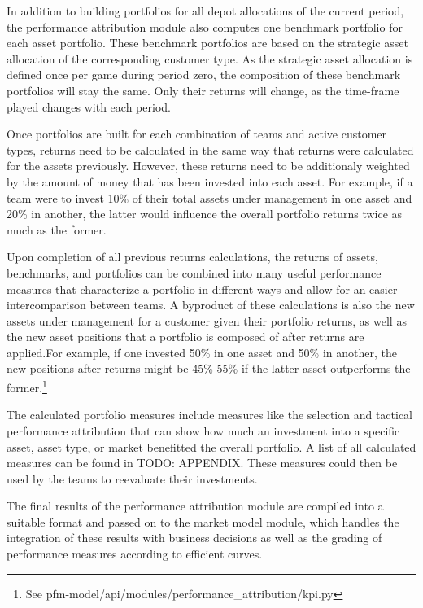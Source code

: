 In addition to building portfolios for all depot allocations of the current period, the performance attribution module also computes one benchmark portfolio for each asset portfolio. These benchmark portfolios are based on the strategic asset allocation of the corresponding customer type. As the strategic asset allocation is defined once per game during period zero, the composition of these benchmark portfolios will stay the same. Only their returns will change, as the time-frame played changes with each period.

Once portfolios are built for each combination of teams and active customer types, returns need to be calculated in the same way that returns were calculated for the assets previously. However, these returns need to be additionaly weighted by the amount of money that has been invested into each asset. For example, if a team were to invest 10\% of their total assets under management in one asset and 20\% in another, the latter would influence the overall portfolio returns twice as much as the former.

Upon completion of all previous returns calculations, the returns of assets, benchmarks, and portfolios can be combined into many useful performance measures that characterize a portfolio in different ways and allow for an easier intercomparison between teams. A byproduct of these calculations is also the new assets under management for a customer given their portfolio returns, as well as the new asset positions that a portfolio is composed of after returns are applied.For example, if one invested 50\% in one asset and 50\% in another, the new positions after returns might be 45\%-55\% if the latter asset outperforms the former.\footnote{See pfm-model/api/modules/performance\_attribution/kpi.py}

The calculated portfolio measures include measures like the selection and tactical performance attribution that can show how much an investment into a specific asset, asset type, or market benefitted the overall portfolio. A list of all calculated measures can be found in TODO: APPENDIX. These measures could then be used by the teams to reevaluate their investments.

The final results of the performance attribution module are compiled into a suitable format and passed on to the market model module, which handles the integration of these results with business decisions as well as the grading of performance measures according to efficient curves.


